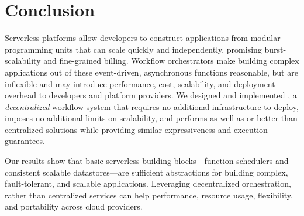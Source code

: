 \section{Conclusion}\label{sec:conclusion}

Serverless platforms allow developers to construct applications from modular
programming units that can scale quickly and independently, promising
burst-scalability and fine-grained billing. Workflow orchestrators make building
complex applications out of these event-driven, asynchronous functions
reasonable, but are inflexible and may introduce performance, cost, scalability,
and deployment overhead to developers and platform providers. We designed and
implemented \name{}, a \emph{decentralized} workflow system that requires no
additional infrastructure to deploy, imposes no additional limits on
scalability, and performs as well as or better than centralized solutions while
providing similar expressiveness and execution guarantees.

Our results show that basic serverless building blocks---function schedulers and
consistent scalable datastores---are sufficient abstractions for building
complex, fault-tolerant, and scalable applications. Leveraging decentralized
orchestration, rather than centralized services can help performance, resource
usage, flexibility, and portability across cloud providers.
